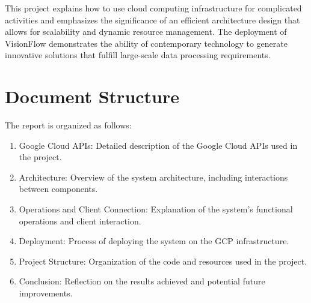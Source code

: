This project explains how to use cloud computing infrastructure for complicated activities and emphasizes the significance of an efficient architecture design that allows for scalability and dynamic resource management. The deployment of VisionFlow demonstrates the ability of contemporary technology to generate innovative solutions that fulfill large-scale data processing requirements.

\section{Document Structure}\label{sec:document_structure}

The report is organized as follows:

\begin{enumerate}
    \item Google Cloud APIs: Detailed description of the Google Cloud APIs used in the project.
    \item Architecture: Overview of the system architecture, including interactions between components.
    \item Operations and Client Connection: Explanation of the system's functional operations and client interaction.
    \item Deployment: Process of deploying the system on the GCP infrastructure.
    \item Project Structure: Organization of the code and resources used in the project.
    \item Conclusion: Reflection on the results achieved and potential future improvements.
\end{enumerate}